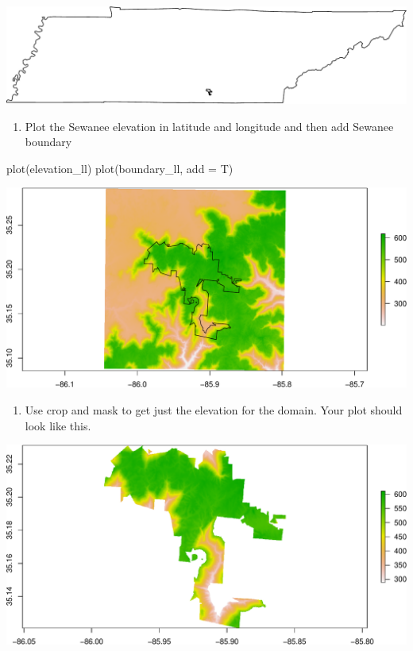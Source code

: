 \documentclass[
]{book}
\newenvironment{Shaded}{\begin{snugshade}}{\end{snugshade}}
\newcommand{\AttributeTok}[1]{\textcolor[rgb]{0.77,0.63,0.00}{#1}}
\newcommand{\FunctionTok}[1]{\textcolor[rgb]{0.00,0.00,0.00}{#1}}
\newcommand{\NormalTok}[1]{#1}
\providecommand{\tightlist}{%
  \setlength{\itemsep}{0pt}\setlength{\parskip}{0pt}}
\begin{document}
\includegraphics{figures/unnamed-chunk-429-1.pdf}

\begin{enumerate}
\def\labelenumi{\arabic{enumi}.}
\setcounter{enumi}{21}
\tightlist
\item
  Plot the Sewanee elevation in latitude and longitude and then add Sewanee boundary
\end{enumerate}

\begin{Shaded}
\begin{Highlighting}[]
\FunctionTok{plot}\NormalTok{(elevation\_ll)}
\FunctionTok{plot}\NormalTok{(boundary\_ll, }\AttributeTok{add =}\NormalTok{ T)}
\end{Highlighting}
\end{Shaded}

\includegraphics{figures/unnamed-chunk-430-1.pdf}

\begin{enumerate}
\def\labelenumi{\arabic{enumi}.}
\setcounter{enumi}{22}
\tightlist
\item
  Use crop and mask to get just the elevation for the domain. Your plot should look like this.
\end{enumerate}

\includegraphics{figures/unnamed-chunk-431-1.pdf}
\end{document}
